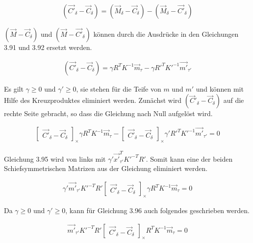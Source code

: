 \begin{gather}
(\vec{C'}_\delta - \vec{C}_\delta) = (\vec{M}_\delta - \vec{C}_\delta) - (\vec{M}_\delta - \vec{C'}_\delta)
\end{gather}

$(\vec{M}-\vec{C}_\delta)$ und $(\vec{M} - \vec{C'}_\delta)$ können durch die Ausdrücke in den Gleichungen 3.91 und 3.92 ersetzt werden.

\begin{gather}
(\vec{C'}_\delta - \vec{C}_\delta) = \gamma R^TK^{-1}\vec{m}_\tau - \gamma R'^TK'^{-1}\vec{m'}_{\tau'}
\end{gather}

Es gilt $\gamma \geq 0$ und $\gamma' \geq 0$, sie stehen für die Teife von $m$ und $m'$ und können mit Hilfe des Kreuzproduktes eliminiert werden\cite{Elements}. Zunächst wird $(\vec{C}'_\delta - \vec{C}_\delta)$ auf die rechte Seite gebracht, so dass die Gleichung nach Null aufgelöst wird.


\begin{gather}
\begin{bmatrix}\vec{C'}_\delta - \vec{C}_\delta\end{bmatrix}_\times \gamma R^TK^{-1}\vec{m}_\tau - 
\begin{bmatrix}	\vec{C'}_\delta - \vec{C}_\delta\end{bmatrix}_\times \gamma' R'^TK'^{-1} \vec{m'}_{\tau'} =  0
\end{gather}

Gleichung 3.95 wird von links mit $\gamma' \vec{x'}^T_{\tau'}K'^{-T}R'$. Somit kann eine der beiden Schiefsymmetrischen Matrizen aus der Gleichung eliminiert werden. 

\begin{gather}
\gamma' \vec{m'}_{\tau'} K'^{-T}R' \begin{bmatrix}	\vec{C'}_\delta - \vec{C}_\delta\end{bmatrix}_\times \gamma R^TK^{-1}\vec{m}_\tau = 0
\end{gather}

Da $\gamma \geq 0$ und $\gamma' \geq 0$, kann für Gleichung 3.96 auch folgendes geschrieben werden.

\begin{gather}
\vec{m'}_{\tau'} K'^{-T}R' \begin{bmatrix}	\vec{C'}_\delta - \vec{C}_\delta\end{bmatrix}_\times R^TK^{-1}\vec{m}_\tau = 0
\end{gather}

